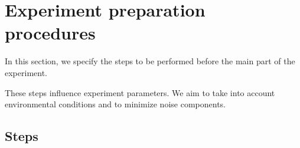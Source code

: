 \hypertarget{experiment-preparation-procedures}{%
\section{Experiment preparation procedures}\label{experiment-preparation-procedures}}

In this section, we specify the steps to be performed before the main
part of the experiment.

These steps influence experiment parameters. We aim to take into account
environmental conditions and to minimize noise components.

\hypertarget{steps}{%
\subsection{Steps}\label{steps}}

